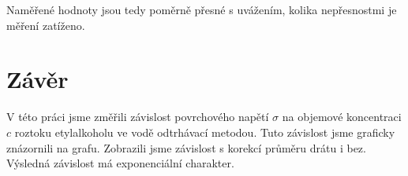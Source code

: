 Naměřené hodnoty jsou tedy poměrně přesné s uvážením, kolika nepřesnostmi je měření zatíženo.
\section{Závěr}

V této práci jsme změřili závislost povrchového napětí $\sigma$ na objemové koncentraci $c$ roztoku etylalkoholu ve vodě odtrhávací metodou. Tuto závislost jsme graficky znázornili na grafu. Zobrazili jsme závislost s korekcí průměru drátu i bez. Výsledná závislost má exponenciální charakter.